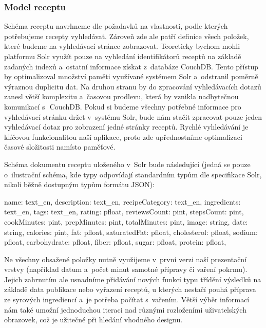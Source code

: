 \subsubsection{Model receptu}

Schéma receptu navrhneme dle požadavků na vlastnosti, podle kterých potřebujeme recepty vyhledávat. Zároveň zde ale patří definice všech položek, které budeme na vyhledávací stránce zobrazovat. Teoreticky bychom mohli platformu Solr využít pouze na vyhledání identifikátorů receptů na základě zadaných indexů a~ostatní informace získat z~databáze CouchDB. Tento přístup by optimalizoval množství paměti využívané systémem Solr a~odstranil poměrně výraznou duplicitu dat. Na druhou stranu by do zpracování vyhledávacích dotazů zanesl větší komplexitu a~časovou prodlevu, která by vznikla nadbytečnou komunikací s~\,CouchDB. Pokud si budeme všechny potřebné informace pro vyhledávací stránku držet v~systému Solr, bude nám stačit zpracovat pouze jeden vyhledávací dotaz pro zobrazení jedné stránky receptů. Rychlé vyhledávání je klíčovou funkcionalitou naší aplikace, proto zde upřednostníme optimalizaci časové složitosti namísto paměťové.

Schéma dokumentu receptu uloženého v~Solr bude následující (jedná se pouze o~ilustrační schéma, kde typy odpovídají standardním typům dle specifikace Solr, nikoli běžně dostupným typům formátu JSON):

\begin{code}
{
    name: text_en,
    description: text_en,
    recipeCategory: text_en,
    ingredients: text_en,
    tags: text_en,
    rating: pfloat,
    reviewsCount: pint,
    stepsCount: pint,
    cookMinutes: pint,
    prepMinutes: pint,
    totalMinutes: pint,
    image: string,
    date: string,
    calories: pint,
    fat: pfloat,
    saturatedFat: pfloat,
    cholesterol: pfloat,
    sodium: pfloat,
    carbohydrate: pfloat,
    fiber: pfloat,
    sugar: pfloat,
    protein: pfloat,
}
\end{code}

Ne všechny obsažené položky nutně využijeme v~první verzi naší prezentační vrstvy (například datum a~počet minut samotné přípravy či vaření pokrmu). Jejich zahrnutím ale usnadníme přidávání nových funkcí typu třídění výsledků na základě data publikace nebo vyřazení receptů, u kterých nestačí pouhá příprava ze syrových ingrediencí a~je potřeba počítat s~vařením. Větší výběr informací nám také umožní jednoduchou iteraci nad různými rozloženími uživatelských obrazovek, což je užitečné při hledání vhodného designu.

